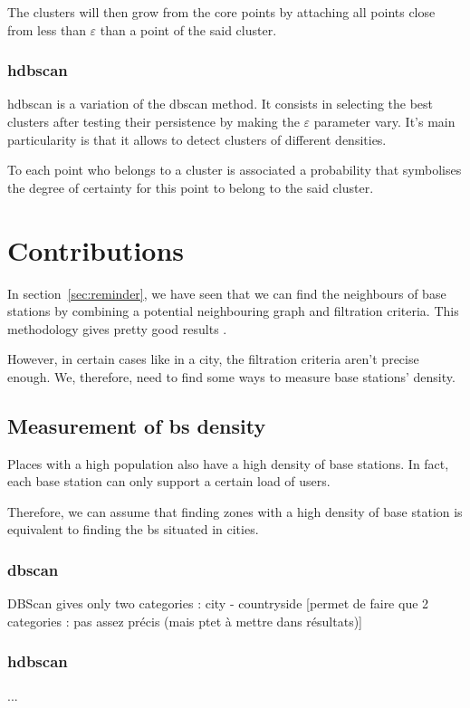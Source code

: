 \documentclass[lettersize,journal,english]{IEEEtran}
\begin{document}
The clusters will then \og grow\fg{} from the core points by attaching all points close from less than \emph{$\varepsilon$} than a point of the said 
cluster.

\subsubsection{\acrshort{hdbscan}}
\acrshort{hdbscan} \cite{10.1007/978-3-642-37456-2_14} is a variation of the \acrshort{dbscan} method. It consists
in selecting the best clusters after testing their persistence by making the $\varepsilon$ parameter vary. It's main particularity
is that it allows to detect clusters of different densities.

To each point who belongs to a cluster is associated a probability that symbolises the degree of certainty for this point to belong
to the said cluster.

\section{Contributions}
\noindent In section~\ref{sec:reminder}, we have seen that we can find the neighbours of base stations
by combining a potential neighbouring graph and filtration criteria. This methodology gives pretty good results \cite{art_del_paq}.

However, in certain cases like in a city, the filtration criteria aren't precise enough. We, therefore, need to find some ways to measure base stations' density.

\subsection{Measurement of \acrshort{bs} density}
Places with a high population also have a high density of base stations. In fact, each base station can only support a certain
load of users.

Therefore, we can assume that finding zones with a high density of base station is equivalent to finding the \acrshort{bs} 
situated in \og cities\fg{}.

\subsubsection{\acrshort{dbscan}}
DBScan gives only two categories : city - countryside
[permet de faire que 2 categories : pas assez précis (mais ptet à mettre dans résultats)]


\subsubsection{\acrshort{hdbscan}}
...
\end{document}
